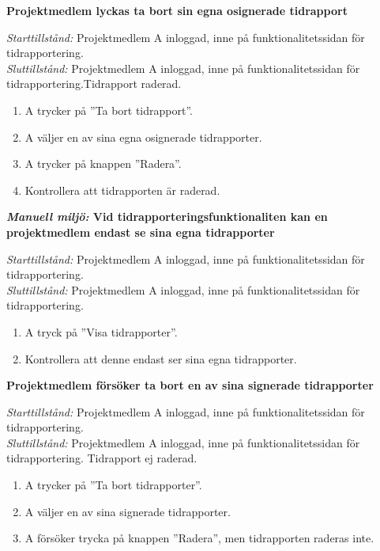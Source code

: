 \documentclass[a4paper]{article}
\begin{document}
\begin{FT}
\item
\textbf{Projektmedlem lyckas ta bort sin egna osignerade tidrapport}

\emph{Starttillstånd:} Projektmedlem A inloggad, inne på funktionalitetssidan för tidrapportering.\\
\emph{Sluttillstånd:} Projektmedlem A inloggad, inne på funktionalitetssidan för tidrapportering.Tidrapport raderad.

\begin{enumerate}
\item A trycker på ''Ta bort tidrapport''.
\item A väljer en av sina egna osignerade tidrapporter.
\item A trycker på knappen ''Radera''.
\item Kontrollera att tidrapporten är raderad.
\end{enumerate}

\item
\textbf{\emph{Manuell miljö:} Vid tidrapporteringsfunktionaliten kan en projektmedlem endast se sina egna tidrapporter} 

\emph{Starttillstånd:} Projektmedlem A inloggad, inne på funktionalitetssidan för tidrapportering.\\
\emph{Sluttillstånd:} Projektmedlem A inloggad, inne på funktionalitetssidan för tidrapportering.

\begin{enumerate}
\item A tryck på ''Visa tidrapporter''.
\item Kontrollera att denne endast ser sina egna tidrapporter.
\end{enumerate}


\item
\textbf{Projektmedlem försöker ta bort en av sina signerade tidrapporter}

\emph{Starttillstånd:} Projektmedlem A inloggad, inne på funktionalitetssidan för tidrapportering.\\
\emph{Sluttillstånd:} Projektmedlem A inloggad, inne på funktionalitetssidan för tidrapportering. Tidrapport ej raderad.

\begin{enumerate}
\item A trycker på ''Ta bort tidrapporter''.
\item A väljer en av sina signerade tidrapporter.
\item A försöker trycka på knappen ''Radera'', men tidrapporten raderas inte.
\end{enumerate}


\end{FT}
\end{document}
